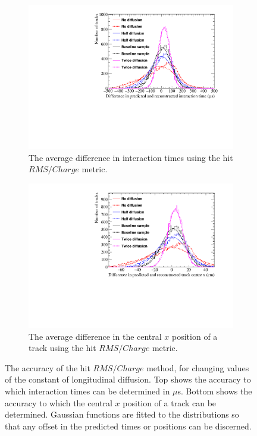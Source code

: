 \begin{figure}
  \centering
  \begin{subfigure}{0.6\textwidth}
    \centering
    \includegraphics[width=\textwidth]{Canvas_AvDiff_T_RMS_Q_Diffusion}
    \caption{The average difference in interaction times using the hit $RMS/Charge$ metric.}
    \label{fig:DiffLDiff_AvDiff_RMS_Int_T}
  \end{subfigure}
  \begin{subfigure}{0.6\textwidth}
    \centering
    \includegraphics[width=\textwidth]{Canvas_AvDiff_X_RMS_Q_Diffusion}
    \caption{The average difference in the central $x$ position of a track using the hit $RMS/Charge$ metric.}
    \label{fig:DiffLDiff_AvDiff_RMS_Int_X}
  \end{subfigure}
  \caption[Comparing the accuracy of the hit $RMS$ method, as the constant of longitudinal diffusion changes]
          {The accuracy of the hit $RMS/Charge$ method, for changing values of the constant of longitudinal diffusion. Top shows the accuracy to which interaction times can be determined in $\mu$s. Bottom shows the accuracy to which the central $x$ position of a track can be determined. Gaussian functions are fitted to the distributions so that any offset in the predicted times or positions can be discerned.}
  \label{fig:DiffLDiff_AvDiff_RMS_Int}
\end{figure}

